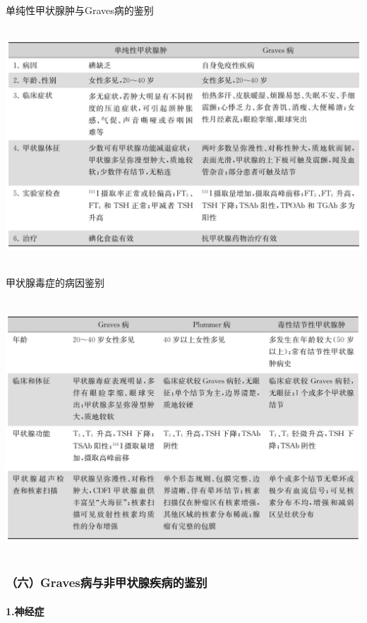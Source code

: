 \begin{table}[htbp]
\centering
\caption{单纯性甲状腺肿与Graves病的鉴别}
\label{tab38-2}
\includegraphics[width=5.90625in,height=3.47917in]{./images/Image00239.jpg}
\end{table}

\begin{table}[htbp]
\centering
\caption{甲状腺毒症的病因鉴别}
\label{tab38-3}
\includegraphics[width=5.90625in,height=3.77083in]{./images/Image00240.jpg}
\end{table}

\subsubsection{（六）Graves病与非甲状腺疾病的鉴别}

\paragraph{1.神经症}

